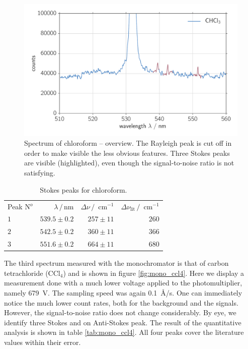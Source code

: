 \begin{figure}[htpb]
    \centering
    \includegraphics[width=0.8\linewidth]{analysis/figures/mono_chcl3}
    \caption{Spectrum of chloroform -- overview. The Rayleigh peak is cut off in order to make visible the less obvious 
    features. Three Stokes peaks are visible (highlighted), even though the signal-to-noise ratio is not satisfying.}
    \label{fig:mono_chcl3}
\end{figure}

\begin{table}[htpb]
    \centering
    \caption{
        Stokes peaks for chloroform. 
        }
    \label{tab:mono_chcl3}
    \begin{tabular}{l r r r}
        \rowcolor{LightCyan} Peak N$^o$ & $\lambda \, / \, \text{nm}$ &
        $\Delta \nu \, / \, \text{ cm}^{-1}$ & 
        $\Delta \nu_\text{lit} \, / \, \text{ cm}^{-1}$ \\
        \cellcolor{LightCyan}$1$ & $539.5 \pm 0.2$ & $257 \pm 11$ & $260$   \\
        \cellcolor{LightCyan}$2$ & $542.5 \pm 0.2$ & $360 \pm 11$ & $366$   \\
        \cellcolor{LightCyan}$3$ & $551.6 \pm 0.2$ & $664 \pm 11$ & $680$  
    \end{tabular}
\end{table}

The third spectrum measured with the monochromator is that of carbon tetrachloride (CCl$_4$) and is shown in figure 
\ref{fig:mono_ccl4}. Here we display a measurement done with a much lower voltage applied to the photomultiplier, 
namely 679~V. The sampling speed was again 0.1~\AA/s. One can immediately notice the much lower count rates, both for 
the background and the signals. However, the signal-to-noise ratio does not change considerably. By eye, we identify 
three Stokes and on Anti-Stokes peak. The result of the quantitative analysis is shown in table \ref{tab:mono_ccl4}. 
All four peaks cover the literature values within their error.

